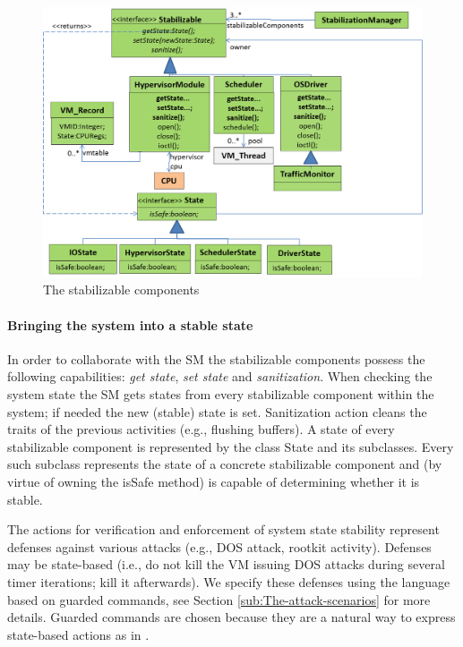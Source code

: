 \begin{figure}
\begin{centering}
\includegraphics[width=12cm]{pictures/stabilizable-components}
\par\end{centering}

\caption{\label{fig:The-stabilizable-components}The stabilizable components}
\end{figure}



\paragraph{Bringing the system into a stable state }

In order to collaborate with the SM the stabilizable components possess
the following capabilities: \textit{get state}, \textit{set state}
and \textit{sanitization}. When checking the system state the SM gets
states from every stabilizable component within the system; if needed
the new (stable) state is set. Sanitization action cleans the traits
of the previous activities (e.g., flushing buffers). A state of every
stabilizable component is represented by the class \textsf{State}
and its subclasses. Every such subclass represents the state of a
concrete stabilizable component and (by virtue of owning the \textsf{isSafe}
method) is capable of determining whether it is stable. 

The actions for verification and enforcement of system state stability
represent defenses against various attacks (e.g., DOS attack, rootkit
activity). Defenses may be state-based (i.e., do not kill the VM issuing
DOS attacks during several timer iterations; kill it afterwards).
We specify these defenses using the language based on guarded commands,
see Section \ref{sub:The-attack-scenarios} for more details. Guarded
commands are chosen because they are a natural way to express state-based
actions as in \cite{Dolev:2009:SPC:1552309.1552312}. 

